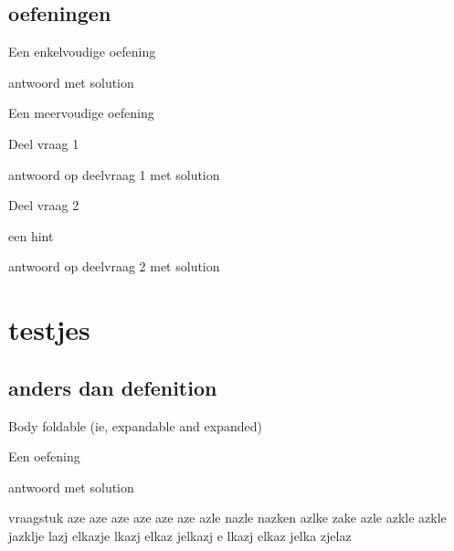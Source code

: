\documentclass{ximera}
\begin{document}
\subsection{oefeningen}
\begin{exercise}\nl
Een enkelvoudige oefening
\begin{solution}
   antwoord met solution
\end{solution}
\end{exercise}

\begin{exercise}\nl
Een meervoudige oefening
\begin{question}
   Deel vraag 1
   \begin{solution}
      antwoord op deelvraag 1 met solution
   \end{solution}
\end{question}
\begin{question}
   Deel vraag 2
   \begin{hint}
      een hint
   \end{hint}
   \begin{solution}
      antwoord op deelvraag 2 met solution
   \end{solution}
\end{question}
\end{exercise}



\section{testjes}
\subsection{anders dan defenition}
\begin{proposition}[foldable=true,title={Behoud van ladingen}]\nl
Body   foldable (ie, expandable and expanded)
\end{proposition}

\begin{exercise}
Een oefening
\begin{solution}
   antwoord met solution
\end{solution}
\end{exercise}


\begin{question}
vraagstuk aze aze aze aze aze aze azle nazle nazken azlke zake azle azkle azkle jazklje lazj elkazje lkazj elkaz jelkazj e lkazj elkaz jelka zjelaz 
\end{question}
\end{document}
